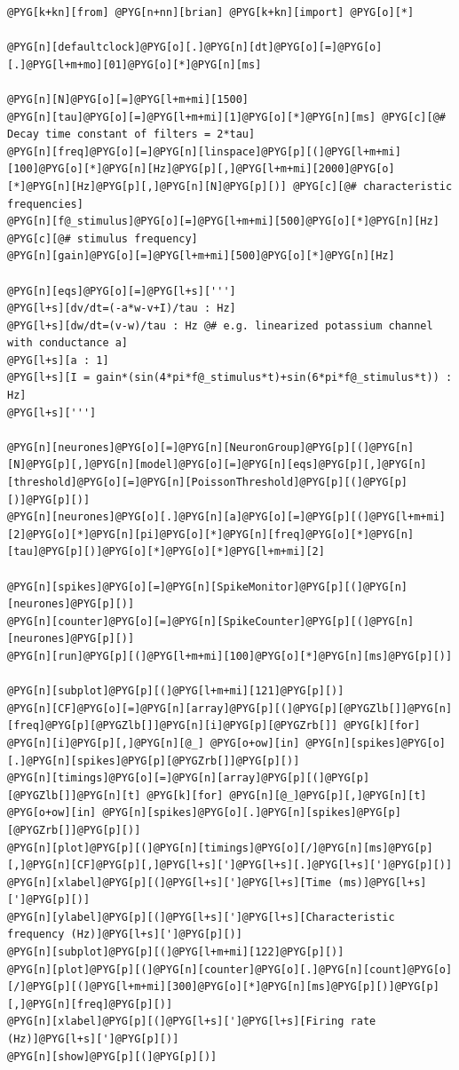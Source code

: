 \documentclass[letterpaper,10pt,english]{manual}
\begin{document}
\begin{Verbatim}[commandchars=@\[\]]
@PYG[k+kn][from] @PYG[n+nn][brian] @PYG[k+kn][import] @PYG[o][*]

@PYG[n][defaultclock]@PYG[o][.]@PYG[n][dt]@PYG[o][=]@PYG[o][.]@PYG[l+m+mo][01]@PYG[o][*]@PYG[n][ms]

@PYG[n][N]@PYG[o][=]@PYG[l+m+mi][1500]
@PYG[n][tau]@PYG[o][=]@PYG[l+m+mi][1]@PYG[o][*]@PYG[n][ms] @PYG[c][@# Decay time constant of filters = 2*tau]
@PYG[n][freq]@PYG[o][=]@PYG[n][linspace]@PYG[p][(]@PYG[l+m+mi][100]@PYG[o][*]@PYG[n][Hz]@PYG[p][,]@PYG[l+m+mi][2000]@PYG[o][*]@PYG[n][Hz]@PYG[p][,]@PYG[n][N]@PYG[p][)] @PYG[c][@# characteristic frequencies]
@PYG[n][f@_stimulus]@PYG[o][=]@PYG[l+m+mi][500]@PYG[o][*]@PYG[n][Hz] @PYG[c][@# stimulus frequency]
@PYG[n][gain]@PYG[o][=]@PYG[l+m+mi][500]@PYG[o][*]@PYG[n][Hz]

@PYG[n][eqs]@PYG[o][=]@PYG[l+s][''']
@PYG[l+s][dv/dt=(-a*w-v+I)/tau : Hz]
@PYG[l+s][dw/dt=(v-w)/tau : Hz @# e.g. linearized potassium channel with conductance a]
@PYG[l+s][a : 1]
@PYG[l+s][I = gain*(sin(4*pi*f@_stimulus*t)+sin(6*pi*f@_stimulus*t)) : Hz]
@PYG[l+s][''']

@PYG[n][neurones]@PYG[o][=]@PYG[n][NeuronGroup]@PYG[p][(]@PYG[n][N]@PYG[p][,]@PYG[n][model]@PYG[o][=]@PYG[n][eqs]@PYG[p][,]@PYG[n][threshold]@PYG[o][=]@PYG[n][PoissonThreshold]@PYG[p][(]@PYG[p][)]@PYG[p][)]
@PYG[n][neurones]@PYG[o][.]@PYG[n][a]@PYG[o][=]@PYG[p][(]@PYG[l+m+mi][2]@PYG[o][*]@PYG[n][pi]@PYG[o][*]@PYG[n][freq]@PYG[o][*]@PYG[n][tau]@PYG[p][)]@PYG[o][*]@PYG[o][*]@PYG[l+m+mi][2]

@PYG[n][spikes]@PYG[o][=]@PYG[n][SpikeMonitor]@PYG[p][(]@PYG[n][neurones]@PYG[p][)]
@PYG[n][counter]@PYG[o][=]@PYG[n][SpikeCounter]@PYG[p][(]@PYG[n][neurones]@PYG[p][)]
@PYG[n][run]@PYG[p][(]@PYG[l+m+mi][100]@PYG[o][*]@PYG[n][ms]@PYG[p][)]

@PYG[n][subplot]@PYG[p][(]@PYG[l+m+mi][121]@PYG[p][)]
@PYG[n][CF]@PYG[o][=]@PYG[n][array]@PYG[p][(]@PYG[p][@PYGZlb[]]@PYG[n][freq]@PYG[p][@PYGZlb[]]@PYG[n][i]@PYG[p][@PYGZrb[]] @PYG[k][for] @PYG[n][i]@PYG[p][,]@PYG[n][@_] @PYG[o+ow][in] @PYG[n][spikes]@PYG[o][.]@PYG[n][spikes]@PYG[p][@PYGZrb[]]@PYG[p][)]
@PYG[n][timings]@PYG[o][=]@PYG[n][array]@PYG[p][(]@PYG[p][@PYGZlb[]]@PYG[n][t] @PYG[k][for] @PYG[n][@_]@PYG[p][,]@PYG[n][t] @PYG[o+ow][in] @PYG[n][spikes]@PYG[o][.]@PYG[n][spikes]@PYG[p][@PYGZrb[]]@PYG[p][)]
@PYG[n][plot]@PYG[p][(]@PYG[n][timings]@PYG[o][/]@PYG[n][ms]@PYG[p][,]@PYG[n][CF]@PYG[p][,]@PYG[l+s][']@PYG[l+s][.]@PYG[l+s][']@PYG[p][)]
@PYG[n][xlabel]@PYG[p][(]@PYG[l+s][']@PYG[l+s][Time (ms)]@PYG[l+s][']@PYG[p][)]
@PYG[n][ylabel]@PYG[p][(]@PYG[l+s][']@PYG[l+s][Characteristic frequency (Hz)]@PYG[l+s][']@PYG[p][)]
@PYG[n][subplot]@PYG[p][(]@PYG[l+m+mi][122]@PYG[p][)]
@PYG[n][plot]@PYG[p][(]@PYG[n][counter]@PYG[o][.]@PYG[n][count]@PYG[o][/]@PYG[p][(]@PYG[l+m+mi][300]@PYG[o][*]@PYG[n][ms]@PYG[p][)]@PYG[p][,]@PYG[n][freq]@PYG[p][)]
@PYG[n][xlabel]@PYG[p][(]@PYG[l+s][']@PYG[l+s][Firing rate (Hz)]@PYG[l+s][']@PYG[p][)]
@PYG[n][show]@PYG[p][(]@PYG[p][)]
\end{Verbatim}
\end{document}
